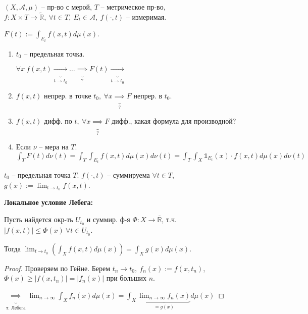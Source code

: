 
\begin{statement}
    $(X, \mathcal{A}, \mu)$ -- пр-во с мерой, $T$ -- метрическое пр-во, $f: X \times T \rightarrow \tilde{\mathbb{R}}, \ \forall t \in T, \ E_t \in \mathcal{A}, \ f(\cdot, t)$ -- измеримая.

    $F(t) := \int_{E_t} {f(x, t) d \mu(x)}$.

    \begin{enumerate}
        \item {
            $t_0$ -- предельная точка.

            $\forall x \ f(x, t) \underbrace{\rightarrow}_{t \rightarrow t_0} \dots \underbrace{\implies}_{?} F(t) \underbrace{\rightarrow}_{t \rightarrow t_0}$
        }
        \item {
            $f(x, t)$ непрер. в точке $t_0, \ \forall x \underbrace{\implies}_{?} F$ непрер. в $t_0$.
        }
        \item {
            $f(x, t)$ дифф. по $t, \ \forall x \underbrace{\implies}_{?} F$ дифф., какая формула для производной?
        }
        \item {
            Если $\nu$ -- мера на $T$. $\int_T {F(t) d \nu (t)} = \int_{T} { \int_{E_t} { f(x, t) d \mu(x) d \nu (t) } } = \int_T { \int_X { \mathds{1}_{E_t} (x) \cdot f(x, t) d \mu (x) d \nu (t) } }$
        }
    \end{enumerate}
\end{statement}
\begin{theorem}
    $t_0$ -- предельная точка $T$. $f(\cdot, t)$ -- суммируема $\forall t \in T$, $g(x) := \lim_{t \rightarrow t_0} { f(x, t) }$.

    \textbf{Локальное условие Лебега:}

    Пусть найдется окр-ть $U_{t_0}$ и суммир. ф-я $\Phi: X \rightarrow \overline{\mathbb{R}}$, т.ч. $|f(x, t)| \leq \Phi(x) \ \forall t \in U_{t_0}$.

    Тогда $\lim_{t \rightarrow t_0} { \left(\int_{X}{f(x, t) d \mu(x)}\right) } = \int_{X} { g(x) d \mu(x) }$.
\end{theorem}

\begin{proof}
    Проверяем по Гейне. Берем $t_n \rightarrow t_0, \ f_n(x) := f(x, t_n)$, $\Phi(x) \geq | f(x, t_n) | = |f_n(x)|$ при больших $n$.

    $\underbrace{\implies}_{\text{т. Лебега}} \lim_{n \rightarrow \infty} { \int_{X} { f_n (x) d \mu (x) } } = \int_{X} { \underbrace{\lim_{n \rightarrow \infty} {f_n(x)}}_{= g(x)} d \mu (x)}$
\end{proof}

